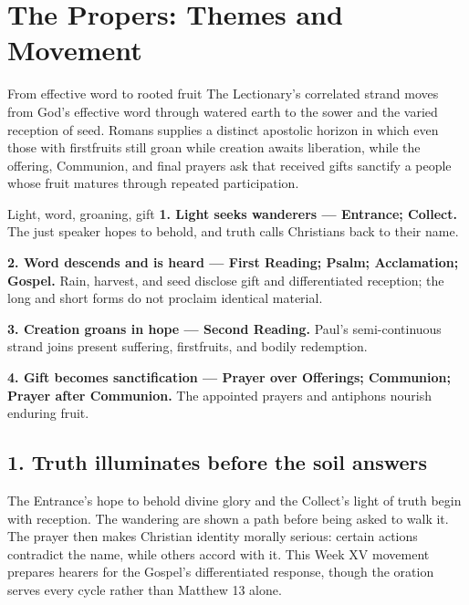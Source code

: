 \section*{The Propers: Themes and Movement}

\begin{massbox}{From effective word to rooted fruit}
The Lectionary's correlated strand moves from God's effective word through watered earth to the sower and the varied reception of seed. Romans supplies a distinct apostolic horizon in which even those with firstfruits still groan while creation awaits liberation, while the offering, Communion, and final prayers ask that received gifts sanctify a people whose fruit matures through repeated participation.
\end{massbox}

\begin{studybox}{Light, word, groaning, gift}
\textbf{1. Light seeks wanderers --- Entrance; Collect.} The just speaker hopes to behold, and truth calls Christians back to their name.\par\smallskip
\textbf{2. Word descends and is heard --- First Reading; Psalm; Acclamation; Gospel.} Rain, harvest, and seed disclose gift and differentiated reception; the long and short forms do not proclaim identical material.\par\smallskip
\textbf{3. Creation groans in hope --- Second Reading.} Paul's semi-continuous strand joins present suffering, firstfruits, and bodily redemption.\par\smallskip
\textbf{4. Gift becomes sanctification --- Prayer over Offerings; Communion; Prayer after Communion.} The appointed prayers and antiphons nourish enduring fruit.
\end{studybox}

\subsection*{1. Truth illuminates before the soil answers\enspace{}}

The Entrance's hope to behold divine glory and the Collect's light of truth begin with reception. The wandering are shown a path before being asked to walk it. The prayer then makes Christian identity morally serious: certain actions contradict the name, while others accord with it. This Week XV movement prepares hearers for the Gospel's differentiated response, though the oration serves every cycle rather than Matthew 13 alone.

